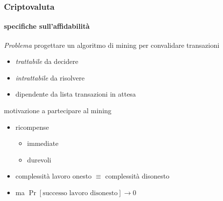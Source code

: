 \begin{frame}

	\frametitle{Criptovaluta}
	\framesubtitle{specifiche sull'affidabilità}
	
	\textit{Problema}
	\newline progettare un algoritmo di {\color{blue}mining} per convalidare transazioni
	\begin{itemize}
	  \item \textit{trattabile} da decidere
	  \item \textit{intrattabile} da risolvere
	  \item dipendente da lista transazioni in attesa
	\end{itemize}
	motivazione a {\color{blue}partecipare} al mining
	\begin{itemize}
		\item ricompense
		\begin{itemize}
		  \item immediate
		  \item durevoli
		\end{itemize}
	  \item complessità lavoro onesto $\equiv$ complessità disonesto 
	  \item ma $\Pr[\text{successo lavoro disonesto}]\rightarrow 0$
	\end{itemize}
	
\end{frame}

	